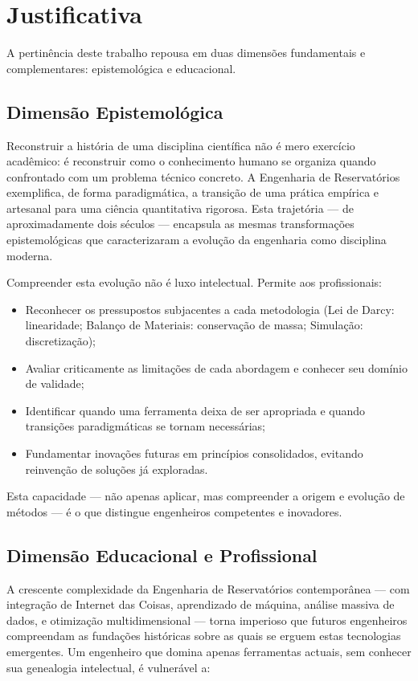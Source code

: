 \documentclass[12pt,a4paper,oneside,brazilian,sumario=tradicional]{abntex2}
\begin{document}
\chapter{Justificativa}

A pertinência deste trabalho repousa em duas dimensões fundamentais e complementares: epistemológica e educacional.

\section*{Dimensão Epistemológica}

Reconstruir a história de uma disciplina científica não é mero exercício acadêmico: é reconstruir como o conhecimento humano se organiza quando confrontado com um problema técnico concreto. A Engenharia de Reservatórios exemplifica, de forma paradigmática, a transição de uma prática empírica e artesanal para uma ciência quantitativa rigorosa. Esta trajetória — de aproximadamente dois séculos — encapsula as mesmas transformações epistemológicas que caracterizaram a evolução da engenharia como disciplina moderna.

Compreender esta evolução não é luxo intelectual. Permite aos profissionais:

\begin{itemize}
  \item Reconhecer os pressupostos subjacentes a cada metodologia (Lei de Darcy: linearidade; Balanço de Materiais: conservação de massa; Simulação: discretização);
  \item Avaliar criticamente as limitações de cada abordagem e conhecer seu domínio de validade;
  \item Identificar quando uma ferramenta deixa de ser apropriada e quando transições paradigmáticas se tornam necessárias;
  \item Fundamentar inovações futuras em princípios consolidados, evitando reinvenção de soluções já exploradas.
\end{itemize}

Esta capacidade — não apenas aplicar, mas compreender a origem e evolução de métodos — é o que distingue engenheiros competentes e inovadores.



\section*{Dimensão Educacional e Profissional}

A crescente complexidade da Engenharia de Reservatórios contemporânea — com integração de Internet das Coisas, aprendizado de máquina, análise massiva de dados, e otimização multidimensional — torna imperioso que futuros engenheiros compreendam as fundações históricas sobre as quais se erguem estas tecnologias emergentes. Um engenheiro que domina apenas ferramentas actuais, sem conhecer sua genealogia intelectual, é vulnerável a:
\end{document}
